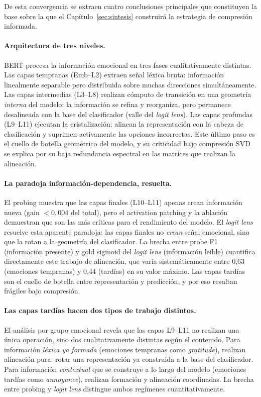 De esta convergencia se extraen cuatro conclusiones principales que
constituyen la base sobre la que el Capítulo~\ref{sec:sintesis}
construirá la estrategia de compresión informada.

\paragraph{Arquitectura de tres niveles.}
BERT procesa la información emocional en tres fases cualitativamente
distintas. Las capas tempranas (Emb--L2) extraen señal léxica bruta:
información linealmente separable pero distribuida sobre muchas
direcciones simultáneamente. Las capas intermedias (L3--L8) realizan
cómputo de transición en una geometría \emph{interna} del modelo: la
información se refina y reorganiza, pero permanece desalineada con la
base del clasificador (valle del \emph{logit lens}). Las capas profundas
(L9--L11) ejecutan la cristalización: alinean la representación con
la cabeza de clasificación y suprimen activamente las opciones
incorrectas. Este último paso es el cuello de botella geométrico del modelo, y su criticidad bajo compresión SVD se
explica por su baja redundancia espectral en las matrices que
realizan la alineación.

\paragraph{La paradoja información-dependencia, resuelta.}
El probing muestra que las capas finales (L10--L11) apenas crean
información nueva (gain $< 0{,}004$ del total), pero el activation
patching y la ablación demuestran que son las más críticas para el
rendimiento del modelo. El \emph{logit lens} resuelve esta aparente paradoja:
las capas finales no \emph{crean} señal emocional, sino que la rotan
a la geometría del clasificador. La brecha entre probe F1 (información
presente) y gold sigmoid del \emph{logit lens} (información leíble)
cuantifica directamente este trabajo de alineación, que varía
sistemáticamente entre 0{,}63 (emociones tempranas) y 0{,}44 (tardías)
en su valor máximo. Las capas tardías son el cuello de botella entre representación y predicción, y por eso resultan frágiles bajo
compresión.

\paragraph{Las capas tardías hacen dos tipos de trabajo distintos.}
El análisis por grupo emocional revela que las capas L9--L11 no
realizan una única operación, sino dos cualitativamente distintas
según el contenido. Para información \emph{léxica ya formada}
(emociones tempranas como \emph{gratitude}), realizan
alineación pura: rotar una representación ya construida a la
base del clasificador. Para información \emph{contextual} que se
construye a lo largo del modelo (emociones tardías como
\emph{annoyance}), realizan formación y alineación coordinadas. La brecha entre probing y \emph{logit lens} distingue ambos
regímenes cuantitativamente.

